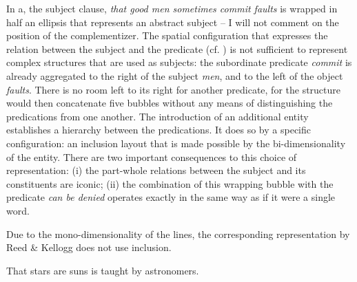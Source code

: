 \documentclass[english,output=paper,colorlinks,citecolor=brown]{../langscibook}
\begin{document}
In a, the subject clause, \textit{that good men sometimes commit faults} is wrapped in half an ellipsis that represents an abstract subject – I will not comment on the position of the complementizer. The spatial configuration that expresses the relation between the subject and the predicate (cf. ) is not sufficient to represent complex structures that are used as subjects: the subordinate predicate \textit{commit} is already aggregated to the right of the subject \textit{men}, and to the left of the object \textit{faults}. There is no room left to its right for another predicate, for the structure would then concatenate five bubbles without any means of distinguishing the predications from one another. The introduction of an additional entity establishes a hierarchy between the predications. It does so by a specific configuration: an inclusion layout that is made possible by the bi-dimensionality of the entity. There are two important consequences to this choice of representation: (i) the part-whole relations between the subject and its constituents are iconic; (ii) the combination of this wrapping bubble with the predicate \textit{can be denied} operates exactly in the same way as if it were a single word.

Due to the mono-dimensionality of the lines, the corresponding representation by Reed \& Kellogg does not use inclusion.

\ea \label{ex:4:5} That stars are suns is taught by astronomers. \z
\end{document}
